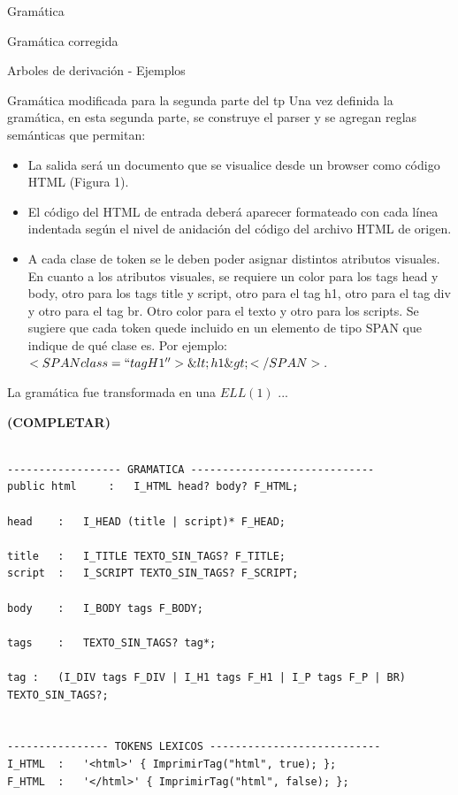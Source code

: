 \documentclass[a4paper,8pt]{article}
\begin{document}
\begin{section}{Gramática}
\begin{subsection}{Gramática corregida}
\begin{subsubsection}{Arboles de derivación - Ejemplos}
 \end{subsubsection}

\end{subsection}
\newpage

\begin{subsection}{Gramática modificada para la segunda parte del tp}
Una vez definida la gramática, en esta segunda parte, se construye el parser y se agregan reglas semánticas que permitan:\\
\begin{itemize}
 \item La salida será un documento que se visualice desde un browser como código HTML (Figura 1).
\item El código del HTML de entrada deberá aparecer formateado con cada línea indentada según el nivel de anidación del código del archivo HTML de origen. 
\item A cada clase de token se le deben poder asignar distintos atributos visuales. En cuanto a los atributos visuales, se requiere un color para los tags head y body, otro para los tags title y script, otro para el tag h1, otro para el tag div y otro para el tag br. Otro color para el texto y otro para los scripts.
Se sugiere que cada token quede incluido en un elemento de tipo SPAN que indique de qué clase es.
Por ejemplo:$<SPAN class=``tagH1''>\&lt;h1\&gt;</SPAN>.$

\end{itemize}

La gramática fue transformada en una $ELL(1)$ ...

\textbf{(COMPLETAR)}
\bigskip

\begin{verbatim}
  
------------------ GRAMATICA -----------------------------
public html 	:	I_HTML head? body? F_HTML;

head 	:	I_HEAD (title | script)* F_HEAD;

title 	:	I_TITLE TEXTO_SIN_TAGS? F_TITLE;
script 	:	I_SCRIPT TEXTO_SIN_TAGS? F_SCRIPT;

body 	:	I_BODY tags F_BODY;

tags	:	TEXTO_SIN_TAGS? tag*;

tag	:	(I_DIV tags F_DIV | I_H1 tags F_H1 | I_P tags F_P | BR) TEXTO_SIN_TAGS?;


---------------- TOKENS LEXICOS ---------------------------
I_HTML 	:	'<html>' { ImprimirTag("html", true); };
F_HTML 	:	'</html>' { ImprimirTag("html", false); };


\end{verbatim}
\end{subsection}
\end{section}
\end{document}
